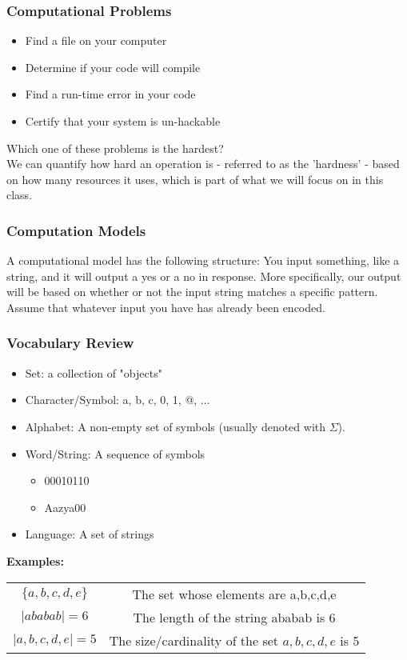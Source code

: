 \documentclass[a4paper, 12pt, margin=1.2in]{article}
\begin{document}
\subsubsection{Computational Problems}
\begin{itemize}
    \item Find a file on your computer
    \item Determine if your code will compile
    \item Find a run-time error in your code
    \item Certify that your system is un-hackable
\end{itemize}
Which one of these problems is the hardest? \\We can quantify how hard an operation is - referred to as the 'hardness' - based on how many resources it uses, which is part of what we will focus on in this class.
\subsubsection{Computation Models}
A computational model has the following structure: You input something, like a string, and it will output a yes or a no in response. More specifically, our output will be based on whether or not the input string matches a specific pattern. Assume that whatever input you have has already been encoded.
\subsubsection{Vocabulary Review}
\begin{itemize}
    \item Set: a collection of "objects"
    \item Character/Symbol: a, b, c, 0, 1, @, ...
    \item Alphabet: A non-empty set of symbols (usually denoted with $\Sigma$).
    \item Word/String: A sequence of symbols
        \begin{itemize}
            \item 00010110
            \item Aazya00
        \end{itemize}
    \item Language: A set of strings
\end{itemize}
\textbf{Examples:}\\
\begin{tabular}{c|c}
     $\{ a,b,c,d,e \}$ & The set whose elements are a,b,c,d,e \\
    $| ababab | = 6$ & The length of the string ababab is 6 \\
    $| { a,b,c,d,e } | = 5$ & The size/cardinality of the set ${a,b,c,d,e}$ is 5
\end{tabular}
\end{document}
